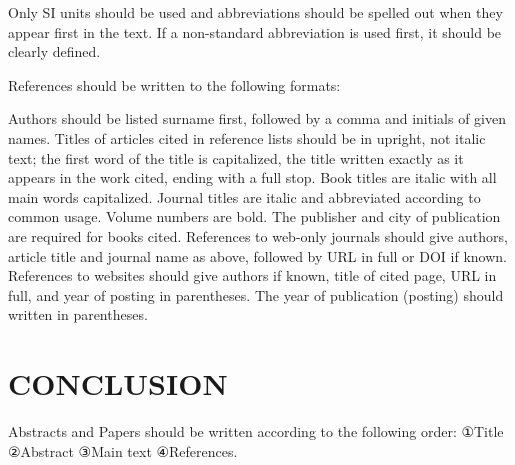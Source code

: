 \documentclass{abstract_hutech}
\begin{document}
Only SI units should be used and abbreviations should be spelled out when they appear first in the text. If a non-standard abbreviation is used first, it should be clearly defined.

References should be written to the following formats:

\noindent Authors should be listed surname first, followed by a comma and initials of given names. Titles of articles cited in reference lists should be in upright, not italic text; the first word of the title is capitalized, the title written exactly as it appears in the work cited, ending with a full stop. Book titles are italic with all main words capitalized. Journal titles are italic and abbreviated according to common usage. Volume numbers are bold. The publisher and city of publication are required for books cited. References to web-only journals should give authors, article title and journal name as above, followed by URL in full or DOI if known. References to websites should give authors if known, title of cited page, URL in full, and year of posting in parentheses. The year of publication (posting) should written in parentheses.

\section{CONCLUSION}

Abstracts and Papers should be written according to the following order: ①Title ②Abstract ③Main text ④References.


\end{document}
